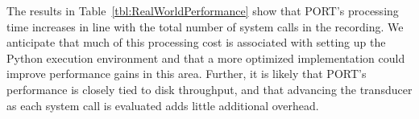 The results in Table~\ref{tbl:RealWorldPerformance} show that
PORT's
processing time increases in line with the total number of system calls
in the recording.  We anticipate that much of this processing cost is
associated with setting up the Python execution environment and that a more
optimized implementation could improve performance gains in this area.
Further,
it is likely that PORT's performance is closely tied to
disk throughput,
and that advancing the transducer
as each system call is evaluated
adds little additional overhead.

